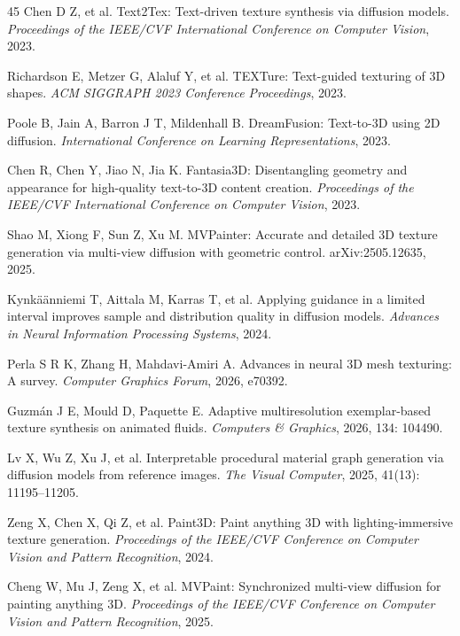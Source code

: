 \documentclass[times,twocolumn,final]{elsarticle}
\begin{document}
\begin{thebibliography}{45}
Chen D Z, et al. Text2Tex: Text-driven texture synthesis via diffusion models. \textit{Proceedings of the IEEE/CVF International Conference on Computer Vision}, 2023.

Richardson E, Metzer G, Alaluf Y, et al. TEXTure: Text-guided texturing of 3D shapes. \textit{ACM SIGGRAPH 2023 Conference Proceedings}, 2023.

Poole B, Jain A, Barron J T, Mildenhall B. DreamFusion: Text-to-3D using 2D diffusion. \textit{International Conference on Learning Representations}, 2023.

Chen R, Chen Y, Jiao N, Jia K. Fantasia3D: Disentangling geometry and appearance for high-quality text-to-3D content creation. \textit{Proceedings of the IEEE/CVF International Conference on Computer Vision}, 2023.

Shao M, Xiong F, Sun Z, Xu M. MVPainter: Accurate and detailed 3D texture generation via multi-view diffusion with geometric control. arXiv:2505.12635, 2025.

Kynk\"a\"anniemi T, Aittala M, Karras T, et al. Applying guidance in a limited interval improves sample and distribution quality in diffusion models. \textit{Advances in Neural Information Processing Systems}, 2024.

Perla S R K, Zhang H, Mahdavi-Amiri A. Advances in neural 3D mesh texturing: A survey. \textit{Computer Graphics Forum}, 2026, e70392.

Guzm\'an J E, Mould D, Paquette E. Adaptive multiresolution exemplar-based texture synthesis on animated fluids. \textit{Computers \& Graphics}, 2026, 134: 104490.

Lv X, Wu Z, Xu J, et al. Interpretable procedural material graph generation via diffusion models from reference images. \textit{The Visual Computer}, 2025, 41(13): 11195--11205.

Zeng X, Chen X, Qi Z, et al. Paint3D: Paint anything 3D with lighting-immersive texture generation. \textit{Proceedings of the IEEE/CVF Conference on Computer Vision and Pattern Recognition}, 2024.

Cheng W, Mu J, Zeng X, et al. MVPaint: Synchronized multi-view diffusion for painting anything 3D. \textit{Proceedings of the IEEE/CVF Conference on Computer Vision and Pattern Recognition}, 2025.


\end{thebibliography}
\end{document}
